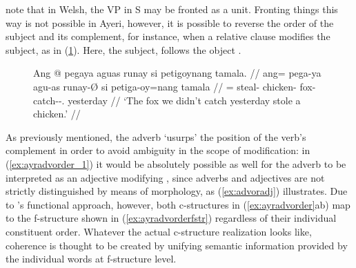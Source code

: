 
\citet{bresnan2016} note that in Welsh, the VP in S may be fronted as a unit.
Fronting things this way is not possible in Ayeri, however, it is possible to
reverse the order of the subject and its complement, for instance, when a
relative clause modifies the subject, as in (\ref{ex:ayrsinv}). Here, the
subject,  follows the
object .

\begin{figure}
\ex\label{ex:ayrsinv}\begingl
	\gla Ang @ pegaya aguas runay si petigoynang tamala. //
	\glb ang= pega-ya agu-as runay-Ø si petiga-oy=nang tamala //
	\glc \AgtT{}= steal-\TsgM{} chicken-\Parg{} fox-\Top{} \Rel{}
		catch-\Neg{}-\Fpl {}.\Aarg{} yesterday //
	\glft `The fox we didn't catch yesterday stole a chicken.' //
\endgl\xe
\end{figure}

As previously mentioned, the adverb `usurps' the position of the
verb's complement in order to avoid ambiguity in the scope of modification:
in (\ref{ex:ayradvorder_1}) it would be absolutely possible as well for the
adverb to be interpreted as an adjective modifying ,
since adverbs and adjectives are not strictly distinguished by means of
morphology, as (\ref{ex:advoradj}) illustrates. Due to \Lfg{}'s functional
approach, however, both c-structures in (\ref{ex:ayradvorder}ab) map to the
f-structure shown in (\ref{ex:ayradvorderfstr}) regardless of their individual
constituent order. Whatever the actual c-structure realization looks like,
coherence is thought to be created by unifying semantic information provided by
the individual words at f-structure level.

